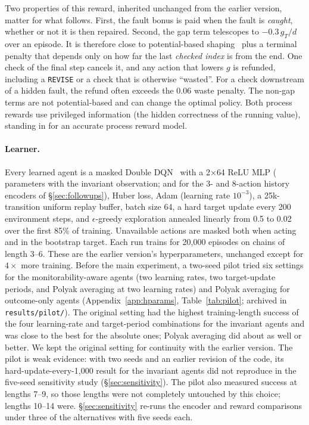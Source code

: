 Two properties of this reward, inherited unchanged from the earlier version, matter for what follows. First, the fault bonus is paid when the fault is \emph{caught}, whether or not it is then repaired. Second, the gap term telescopes to $-0.3\,g_T/d$ over an episode. It is therefore close to potential-based shaping~\citep{ng1999shaping} plus a terminal penalty that depends only on how far the last \emph{checked index} is from the end. One check of the final step cancels it, and any action that lowers $g$ is refunded, including a \texttt{REVISE} or a check that is otherwise ``wasted''. For a check downstream of a hidden fault, the refund often exceeds the $0.06$ waste penalty. The non-gap terms are not potential-based and can change the optimal policy. Both process rewards use privileged information (the hidden correctness of the running value), standing in for an accurate process reward model.

\paragraph{Learner.}
Every learned agent is a masked Double DQN~\citep{mnih2015human,vanhasselt2016double} with a 2$\times$64 ReLU MLP ( parameters with the invariant observation;  and  for the 3- and 8-action history encoders of \S\ref{sec:followups}), Huber loss, Adam (learning rate $10^{-3}$), a 25k-transition uniform replay buffer, batch size 64, a hard target update every 200 environment steps, and $\epsilon$-greedy exploration annealed linearly from 0.5 to 0.02 over the first 85\% of training. Unavailable actions are masked both when acting and in the bootstrap target. Each run trains for 20{,}000 episodes on chains of length 3--6. These are the earlier version's hyperparameters, unchanged except for $4{\times}$ more training. Before the main experiment, a two-seed pilot tried six settings for the monitorability-aware agents (two learning rates, two target-update periods, and Polyak averaging at two learning rates) and Polyak averaging for outcome-only agents (Appendix~\ref{app:hparams}, Table~\ref{tab:pilot}; archived in \texttt{results/pilot/}). The original setting had the highest training-length success of the four learning-rate and target-period combinations for the invariant agents and was close to the best for the absolute ones; Polyak averaging did about as well or better. We kept the original setting for continuity with the earlier version. The pilot is weak evidence: with two seeds and an earlier revision of the code, its hard-update-every-1{,}000 result for the invariant agents did not reproduce in the five-seed sensitivity study (\S\ref{sec:sensitivity}). The pilot also measured success at lengths 7--9, so those lengths were not completely untouched by this choice; lengths 10--14 were. \S\ref{sec:sensitivity} re-runs the encoder and reward comparisons under three of the alternatives with five seeds each.

